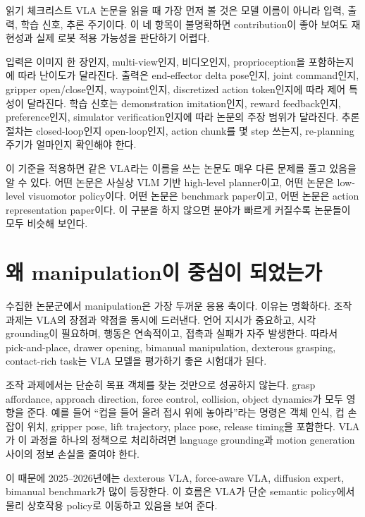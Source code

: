 \begin{conceptbox}{읽기 체크리스트}
VLA 논문을 읽을 때 가장 먼저 볼 것은 모델 이름이 아니라 입력, 출력, 학습 신호, 추론 주기이다. 이 네 항목이 불명확하면 contribution이 좋아 보여도 재현성과 실제 로봇 적용 가능성을 판단하기 어렵다.
\end{conceptbox}

입력은 이미지 한 장인지, multi-view인지, 비디오인지, proprioception을 포함하는지에 따라 난이도가 달라진다. 출력은 end-effector delta pose인지, joint command인지, gripper open/close인지, waypoint인지, discretized action token인지에 따라 제어 특성이 달라진다. 학습 신호는 demonstration imitation인지, reward feedback인지, preference인지, simulator verification인지에 따라 논문의 주장 범위가 달라진다. 추론 절차는 closed-loop인지 open-loop인지, action chunk를 몇 step 쓰는지, re-planning 주기가 얼마인지 확인해야 한다.

이 기준을 적용하면 같은 VLA라는 이름을 쓰는 논문도 매우 다른 문제를 풀고 있음을 알 수 있다. 어떤 논문은 사실상 VLM 기반 high-level planner이고, 어떤 논문은 low-level visuomotor policy이다. 어떤 논문은 benchmark paper이고, 어떤 논문은 action representation paper이다. 이 구분을 하지 않으면 분야가 빠르게 커질수록 논문들이 모두 비슷해 보인다.

\section{왜 manipulation이 중심이 되었는가}

수집한 논문군에서 manipulation은 가장 두꺼운 응용 축이다. 이유는 명확하다. 조작 과제는 VLA의 장점과 약점을 동시에 드러낸다. 언어 지시가 중요하고, 시각 grounding이 필요하며, 행동은 연속적이고, 접촉과 실패가 자주 발생한다. 따라서 pick-and-place, drawer opening, bimanual manipulation, dexterous grasping, contact-rich task는 VLA 모델을 평가하기 좋은 시험대가 된다.

조작 과제에서는 단순히 목표 객체를 찾는 것만으로 성공하지 않는다. grasp affordance, approach direction, force control, collision, object dynamics가 모두 영향을 준다. 예를 들어 ``컵을 들어 올려 접시 위에 놓아라''라는 명령은 객체 인식, 컵 손잡이 위치, gripper pose, lift trajectory, place pose, release timing을 포함한다. VLA가 이 과정을 하나의 정책으로 처리하려면 language grounding과 motion generation 사이의 정보 손실을 줄여야 한다.

이 때문에 2025--2026년에는 dexterous VLA, force-aware VLA, diffusion expert, bimanual benchmark가 많이 등장한다. 이 흐름은 VLA가 단순 semantic policy에서 물리 상호작용 policy로 이동하고 있음을 보여 준다.

